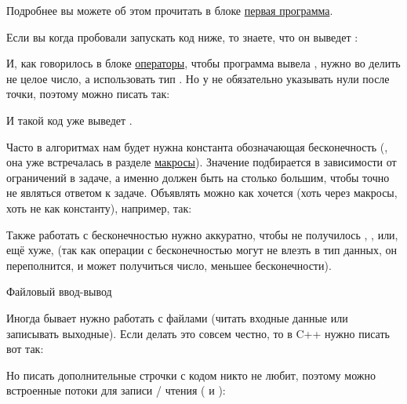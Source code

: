 Подробнее вы можете об этом прочитать в блоке \hyperlink{1.1}{первая программа}.


\startspace
{}
\endspace

Если вы когда пробовали запускать код ниже, то знаете, что он выведет :


И, как говорилось в блоке \hyperlink{1.3}{операторы}, чтобы программа вывела , нужно во делить не целое число, а использовать тип . Но у  не обязательно указывать нули после точки, поэтому можно писать так:


И такой код уже выведет .


\startspace
{}
\endspace

Часто в алгоритмах нам будет нужна константа обозначающая бесконечность (, она уже встречалась в разделе \hyperlink{macros}{макросы}). Значение  подбирается в зависимости от ограничений в задаче, а именно  должен быть на столько большим, чтобы точно не являться ответом к задаче. Объявлять  можно как хочется (хоть через макросы, хоть не как константу), например, так:


Также работать с бесконечностью нужно аккуратно, чтобы не получилось , , или, ещё хуже,  (так как операции с бесконечностью могут не влезть в тип данных, он переполнится, и может получиться число, меньшее бесконечности).


\startspace
Файловый ввод-вывод
\endspace

Иногда бывает нужно работать с файлами (читать входные данные или записывать выходные). Если делать это совсем честно, то в C++ нужно писать вот так:


Но писать дополнительные строчки с кодом никто не любит, поэтому можно  встроенные потоки для записи / чтения ( и ):







